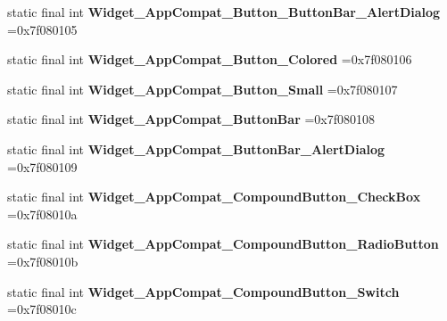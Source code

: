 \begin{DoxyCompactItemize}
\item 
\hypertarget{classcheck_1_1test_1_1_r_1_1style_a02134a5aee38731e4b4df5daa7bd443c}{}static final int {\bfseries Widget\+\_\+\+App\+Compat\+\_\+\+Button\+\_\+\+Button\+Bar\+\_\+\+Alert\+Dialog} =0x7f080105\label{classcheck_1_1test_1_1_r_1_1style_a02134a5aee38731e4b4df5daa7bd443c}

\item 
\hypertarget{classcheck_1_1test_1_1_r_1_1style_aafd3d1bb1ba6b99dd2d3eafa9eff2e84}{}static final int {\bfseries Widget\+\_\+\+App\+Compat\+\_\+\+Button\+\_\+\+Colored} =0x7f080106\label{classcheck_1_1test_1_1_r_1_1style_aafd3d1bb1ba6b99dd2d3eafa9eff2e84}

\item 
\hypertarget{classcheck_1_1test_1_1_r_1_1style_a1232d6dfa2924d9b2f7a12f662b0e902}{}static final int {\bfseries Widget\+\_\+\+App\+Compat\+\_\+\+Button\+\_\+\+Small} =0x7f080107\label{classcheck_1_1test_1_1_r_1_1style_a1232d6dfa2924d9b2f7a12f662b0e902}

\item 
\hypertarget{classcheck_1_1test_1_1_r_1_1style_adf14a882c56681231341dc954df993b0}{}static final int {\bfseries Widget\+\_\+\+App\+Compat\+\_\+\+Button\+Bar} =0x7f080108\label{classcheck_1_1test_1_1_r_1_1style_adf14a882c56681231341dc954df993b0}

\item 
\hypertarget{classcheck_1_1test_1_1_r_1_1style_acd701b3b505a8a1472437ee5cf72a127}{}static final int {\bfseries Widget\+\_\+\+App\+Compat\+\_\+\+Button\+Bar\+\_\+\+Alert\+Dialog} =0x7f080109\label{classcheck_1_1test_1_1_r_1_1style_acd701b3b505a8a1472437ee5cf72a127}

\item 
\hypertarget{classcheck_1_1test_1_1_r_1_1style_a85225a65daae2109685e1a34e918d836}{}static final int {\bfseries Widget\+\_\+\+App\+Compat\+\_\+\+Compound\+Button\+\_\+\+Check\+Box} =0x7f08010a\label{classcheck_1_1test_1_1_r_1_1style_a85225a65daae2109685e1a34e918d836}

\item 
\hypertarget{classcheck_1_1test_1_1_r_1_1style_ae432cb96c804e52d67339a7767da85b9}{}static final int {\bfseries Widget\+\_\+\+App\+Compat\+\_\+\+Compound\+Button\+\_\+\+Radio\+Button} =0x7f08010b\label{classcheck_1_1test_1_1_r_1_1style_ae432cb96c804e52d67339a7767da85b9}

\item 
\hypertarget{classcheck_1_1test_1_1_r_1_1style_ace4cb6cb54e1aad8a075c6c96032007d}{}static final int {\bfseries Widget\+\_\+\+App\+Compat\+\_\+\+Compound\+Button\+\_\+\+Switch} =0x7f08010c\label{classcheck_1_1test_1_1_r_1_1style_ace4cb6cb54e1aad8a075c6c96032007d}


\end{DoxyCompactItemize}
